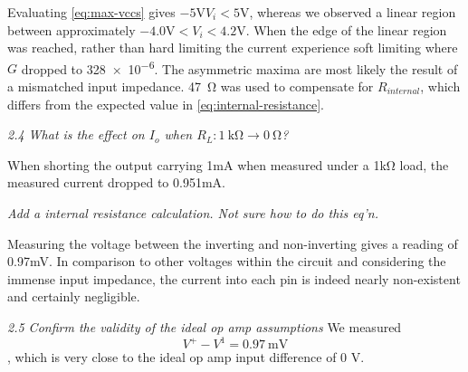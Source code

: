 Evaluating \eqref{eq:max-vccs} gives $-5\si{\volt} V_i < 5\si{\volt}$, whereas we observed a linear region between approximately $-4.0\si{\volt}<V_i<4.2\si{\volt}$. 
When the edge of the linear region was reached, rather than hard limiting the current experience soft limiting where $G$ dropped to \num{328e-6}.
The asymmetric maxima are most likely the result of a mismatched input impedance.
\SI{47}{\ohm} was used to compensate for $R_{internal}$, which differs from the expected value in \eqref{eq:internal-resistance}.

\textit{2.4 What is the effect on $I_o$ when $R_L: \SI{1}{\kilo\ohm} \to \SI{0}{\ohm}$?}

When shorting the output carrying 1\si{\milli\ampere} when measured under a 1\si{\kilo\ohm} load, the measured current dropped to 0.951\si{\milli\ampere}.

\large{\textit{Add a internal resistance calculation. Not sure how to do this eq'n.}}

Measuring the voltage between the inverting and non-inverting gives a reading of 0.97\si{\milli\volt}. In comparison to other voltages within the circuit and considering the immense input impedance, the current into each pin is indeed nearly non-existent and certainly negligible.

\textit{2.5 Confirm the validity of the ideal op amp assumptions}
We measured \[V^+ - V^1 = \SI{0.97}{\milli\volt}\], which is very close to the ideal op amp input difference of 0 V.
